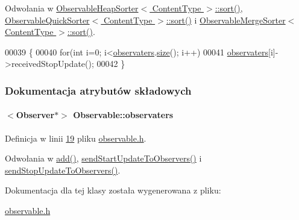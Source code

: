 Odwołania w \hyperlink{observableheapsorter_8h_source_l00026}{Observable\-Heap\-Sorter$<$ Content\-Type $>$\-::sort()}, \hyperlink{observablequicksorter_8h_source_l00026}{Observable\-Quick\-Sorter$<$ Content\-Type $>$\-::sort()} i \hyperlink{observablemergesorter_8h_source_l00026}{Observable\-Merge\-Sorter$<$ Content\-Type $>$\-::sort()}.


\begin{DoxyCode}
00039                                       \{
00040         \textcolor{keywordflow}{for}(\textcolor{keywordtype}{int} i=0; i<\hyperlink{class_observable_af5af34ef633e707ca1525415ee963b91}{observaters}.\hyperlink{class_linked_list_ab399f1dc929c705e9cba628ae1f29254}{size}(); i++)
00041                 \hyperlink{class_observable_af5af34ef633e707ca1525415ee963b91}{observaters}[i]->receivedStopUpdate();
00042     \}
\end{DoxyCode}


\subsubsection{Dokumentacja atrybutów składowych}
\hypertarget{class_observable_af5af34ef633e707ca1525415ee963b91}{
\paragraph[{observaters}]{$<${\bf Observer}$\ast$$>$ Observable\-::observaters}}\label{class_observable_af5af34ef633e707ca1525415ee963b91}


Definicja w linii \hyperlink{observable_8h_source_l00019}{19} pliku \hyperlink{observable_8h_source}{observable.\-h}.



Odwołania w \hyperlink{observable_8h_source_l00023}{add()}, \hyperlink{observable_8h_source_l00029}{send\-Start\-Update\-To\-Observers()} i \hyperlink{observable_8h_source_l00039}{send\-Stop\-Update\-To\-Observers()}.



Dokumentacja dla tej klasy została wygenerowana z pliku\-:\begin{DoxyCompactItemize}
\item 
\hyperlink{observable_8h}{observable.\-h}\end{DoxyCompactItemize}
